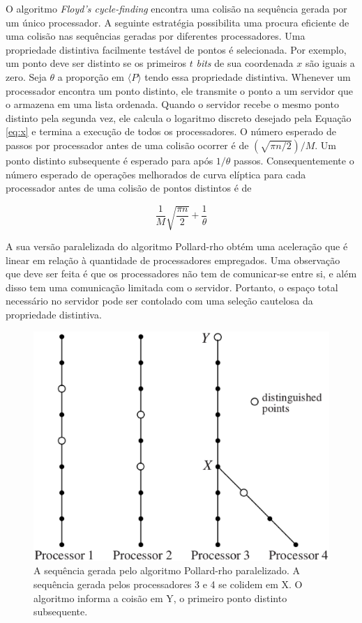 O algoritmo \textit{Floyd's cycle-finding} encontra uma colisão na sequência gerada por um único processador. A seguinte estratégia possibilita uma procura eficiente de uma colisão nas sequências geradas por diferentes processadores. Uma propriedade distintiva facilmente testável de pontos é selecionada. Por exemplo, um ponto deve ser distinto se os primeiros \(t\) \textit{bits} de sua coordenada \(x\) são iguais a zero. Seja \(\theta\) a proporção em $\langle P \rangle$ tendo essa propriedade distintiva. Whenever um processador encontra um ponto distinto, ele transmite o ponto a um servidor que o armazena em uma lista ordenada. Quando o servidor recebe o mesmo ponto distinto pela segunda vez, ele calcula o logaritmo discreto desejado pela Equação \ref{eq:x} e termina a execução de todos os processadores. O número esperado de passos por processador antes de uma colisão ocorrer é de $(\sqrt{\pi n/2})/M$. Um ponto distinto subsequente é esperado para após $1/\theta$ passos. Consequentemente o número esperado de operações melhorados de curva elíptica para cada processador antes de uma colisão de pontos distintos é de

\begin{equation}
\dfrac{1}{M} \sqrt{\dfrac{\pi n}{2}} + \dfrac{1}{\theta}
\end{equation}

A sua versão paralelizada do algoritmo Pollard-rho obtém uma aceleração que é linear em relação à quantidade de processadores empregados. Uma observação que deve ser feita é que os processadores não tem de comunicar-se entre si, e além disso tem uma comunicação limitada com o servidor. Portanto, o espaço total necessário no servidor pode ser contolado com uma seleção cautelosa da propriedade distintiva.

\begin{figure}[h]
\centering
\includegraphics[scale=0.5, bb=0 0 737 604]{figuras/paralellized.eps}
\caption{A sequência gerada pelo algoritmo Pollard-rho paralelizado. A sequência gerada pelos processadores 3 e 4 se colidem em X. O algoritmo informa a coisão em Y, o primeiro ponto distinto subsequente.}
\label{fig:paralellized}
\end{figure}

